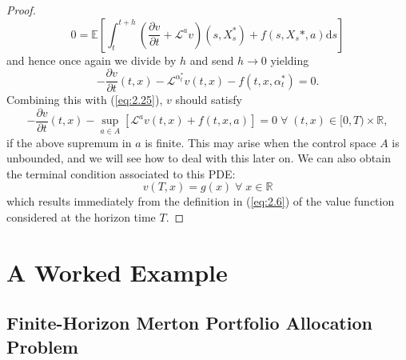 \begin{proof}
\begin{equation}
        0=\mathbb{E}\left[\int_t^{t+h}\left(\frac{\partial v}{\partial t}+\mathcal{L}^av\right)(s,X_s^*)+f(s,X_s*,a)\mathrm ds\right]
    \end{equation}
    and hence once again we divide by $h$ and send $h\rightarrow0$ yielding
    \begin{equation}
        -\frac{\partial v}{\partial t}(t,x)-\mathcal{L}^{\alpha^*_t}v(t,x)-f(t,x,\alpha_t^*)=0.
    \end{equation}
    Combining this with (\ref{eq:2.25}), $v$ should satisfy
    \begin{equation}
        -\frac{\partial v}{\partial t}(t,x)-\sup_{a\in A}\left[\mathcal{L}^av(t,x)+f(t,x,a)\right]=0\;\forall\;(t,x)\in[0,T)\times\mathbb{R},
    \end{equation}
    if the above supremum in $a$ is finite. This may arise when the control space $A$
    is unbounded, and we will see how to deal with this later on. We can also obtain
    the terminal condition associated to this PDE:
    \begin{equation}
        v(T,x)=g(x)\;\forall\;x\in\mathbb{R}
    \end{equation}
    which results immediately from the definition in (\ref{eq:2.6}) of the value function
    considered at the horizon time $T$.
\end{proof}

\section{A Worked Example}\label{sec:2.6}

\subsection*{Finite-Horizon Merton Portfolio Allocation Problem}